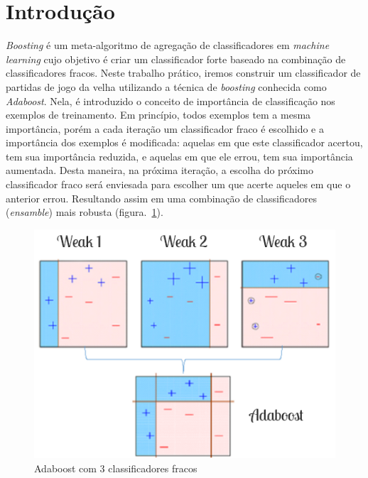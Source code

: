 \section{Introdução}\label{sec:intro}
\emph{Boosting} é um meta-algoritmo de agregação de classificadores em \emph{machine learning} cujo objetivo é criar um classificador forte baseado na combinação de classificadores fracos. Neste trabalho prático, iremos construir um classificador de partidas de jogo da velha utilizando a técnica de \emph{boosting} conhecida como \emph{Adaboost}. Nela, é introduzido o conceito de importância de classificação nos exemplos de treinamento. Em princípio, todos exemplos tem a mesma importância, porém a cada iteração um classificador fraco é escolhido e a importância dos exemplos é modificada: aquelas em que este classificador acertou, tem sua importância reduzida, e aquelas em que ele errou, tem sua importância aumentada. Desta maneira, na próxima iteração, a escolha do próximo classificador fraco será enviesada para escolher um que acerte aqueles em que o anterior errou. Resultando assim em uma combinação de classificadores (\emph{ensamble}) mais robusta (figura.~\ref{fig:adaboost}). 

\begin{figure}[h!]
  \includegraphics[width=\linewidth]{imgs/adaboost.png}
  \caption{Adaboost com 3 classificadores fracos}
  \label{fig:adaboost}
\end{figure}


